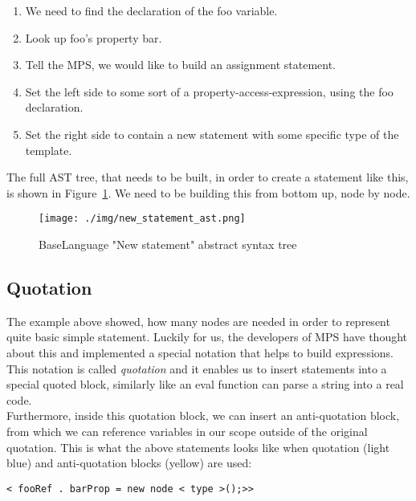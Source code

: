 \begin{enumerate}
	\item We need to find the declaration of the foo variable.
	\item Look up foo's property bar.
	\item Tell the MPS, we would like to build an assignment statement.
	\item Set the left side to some sort of a property-access-expression, using the foo declaration.
	\item Set the right side to contain a new statement with some specific type of the template.
\end{enumerate}

The full AST tree, that needs to be built, in order to create a statement like this, is shown in Figure~\ref{fig:new_ast}.
We need to be building this from bottom up, node by node.

\begin{figure}[h]
	\centering
	\hspace*{-18mm}
	\texttt{[image: ./img/new\_statement\_ast.png]}
	\caption{BaseLanguage "New statement" abstract syntax tree}
	\label{fig:new_ast}
\end{figure}

\subsection{Quotation}
The example above showed, how many nodes are needed in order to represent quite basic simple statement.
Luckily for us, the developers of MPS have thought about this and implemented a special notation that helps to build expressions.
This notation is called \textit{quotation} and it enables us to insert statements into a special quoted block, similarly like an eval function can parse a string into a real code.
\\

Furthermore, inside this quotation block, we can insert an anti-quotation block, from which we can reference variables in our scope outside of the original quotation.
This is what the above statements looks like when quotation (light blue) and anti-quotation blocks (yellow) are used:

\begin{center}
	\texttt{\colorbox{cyan!30}{<}\lexerrule{\%(} fooRef \lexerrule{)\%}.\lexerrule{\%(} barProp \lexerrule{)\%} = new node <\lexerrule{\textasciicircum(} type \lexerrule{)\textasciicircum}>();>\colorbox{cyan!30}{>}}
\end{center}


